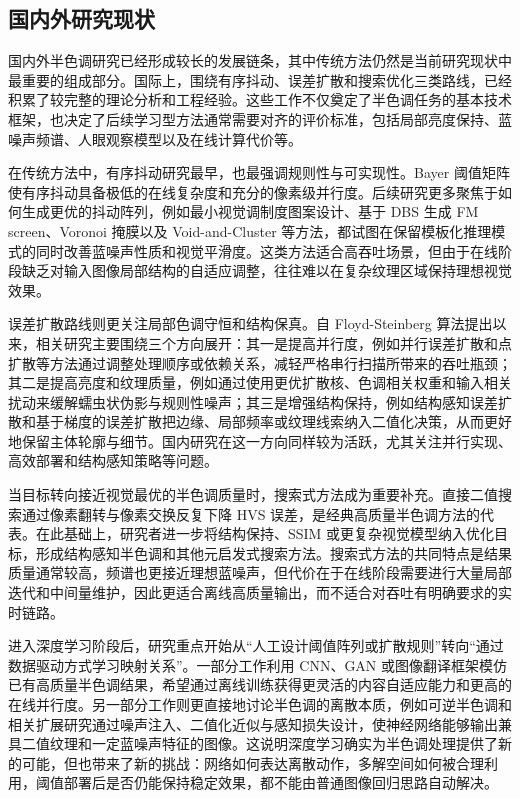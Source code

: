 \documentclass[thesis]{../zstucs-graduation-project}
\begin{document}
\subsection{国内外研究现状}
国内外半色调研究已经形成较长的发展链条，其中传统方法仍然是当前研究现状中最重要的组成部分。国际上，围绕有序抖动、误差扩散和搜索优化三类路线，已经积累了较完整的理论分析和工程经验\cite{LAU2008Modern,ULICHNEY1988Dithering}。这些工作不仅奠定了半色调任务的基本技术框架，也决定了后续学习型方法通常需要对齐的评价标准，包括局部亮度保持、蓝噪声频谱、人眼观察模型以及在线计算代价等。

在传统方法中，有序抖动研究最早，也最强调规则性与可实现性。Bayer 阈值矩阵使有序抖动具备极低的在线复杂度和充分的像素级并行度\cite{BAYER1973An}。后续研究更多聚焦于如何生成更优的抖动阵列，例如最小视觉调制度图案设计、基于 DBS 生成 FM screen、Voronoi 掩膜以及 Void-and-Cluster 等方法，都试图在保留模板化推理模式的同时改善蓝噪声性质和视觉平滑度\cite{SULLIVAN1991Design,ALLEBACH1996FM,GARATEGUY2010Voronoi,ULICHNEY1993Void}。这类方法适合高吞吐场景，但由于在线阶段缺乏对输入图像局部结构的自适应调整，往往难以在复杂纹理区域保持理想视觉效果。

误差扩散路线则更关注局部色调守恒和结构保真。自 Floyd-Steinberg 算法提出以来，相关研究主要围绕三个方向展开：其一是提高并行度，例如并行误差扩散和点扩散等方法通过调整处理顺序或依赖关系，减轻严格串行扫描所带来的吞吐瓶颈\cite{FLOYD1976An,METAXAS1998Optimal}；其二是提高亮度和纹理质量，例如通过使用更优扩散核、色调相关权重和输入相关扰动来缓解蠕虫状伪影与规则性噪声\cite{OSTROMOUKHOV2001A,LI2004Tone}；其三是增强结构保持，例如结构感知误差扩散和基于梯度的误差扩散把边缘、局部频率或纹理线索纳入二值化决策，从而更好地保留主体轮廓与细节\cite{CHANG2009Structure,HU2016Simple,KIYOTOMO2019Appearance}。国内研究在这一方向同样较为活跃，尤其关注并行实现、高效部署和结构感知策略等问题\cite{周研2011数字半色调处理的并行误差扩散算法研究,柳凌岳2014基于误差扩散的高效高质量半色调技术研究}。

当目标转向接近视觉最优的半色调质量时，搜索式方法成为重要补充。直接二值搜索通过像素翻转与像素交换反复下降 HVS 误差，是经典高质量半色调方法的代表\cite{ANALOUI1992Model}。在此基础上，研究者进一步将结构保持、SSIM 或更复杂视觉模型纳入优化目标，形成结构感知半色调和其他元启发式搜索方法\cite{PANG2008Structure,CHATTERJEE2012Towards}。搜索式方法的共同特点是结果质量通常较高，频谱也更接近理想蓝噪声，但代价在于在线阶段需要进行大量局部迭代和中间量维护，因此更适合离线高质量输出，而不适合对吞吐有明确要求的实时链路。

进入深度学习阶段后，研究重点开始从“人工设计阈值阵列或扩散规则”转向“通过数据驱动方式学习映射关系”。一部分工作利用 CNN、GAN 或图像翻译框架模仿已有高质量半色调结果，希望通过离线训练获得更灵活的内容自适应能力和更高的在线并行度\cite{GUO2020H,CHOI2022Mimicking}。另一部分工作则更直接地讨论半色调的离散本质，例如可逆半色调和相关扩展研究通过噪声注入、二值化近似与感知损失设计，使神经网络能够输出兼具二值纹理和一定蓝噪声特征的图像\cite{XIA2021Deep,LAU2023Taming}。这说明深度学习确实为半色调处理提供了新的可能，但也带来了新的挑战：网络如何表达离散动作，多解空间如何被合理利用，阈值部署后是否仍能保持稳定效果，都不能由普通图像回归思路自动解决。
\end{document}
